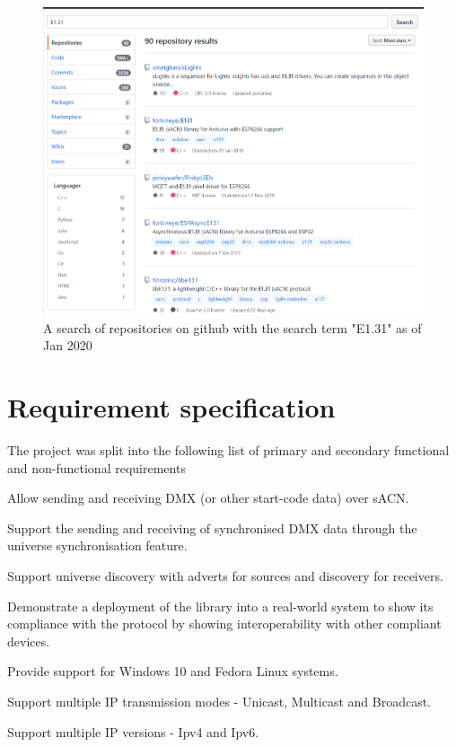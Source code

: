 \documentclass[11pt,a4paper]{article}
\begin{document}
\begin{figure}
	\includegraphics[width=\textwidth]{E131-Repo-Search}
	\caption{A search of repositories on github with the search term "E1.31" as of Jan 2020}
	\label{E131_REPO_SEARCH}
\end{figure}

\section{Requirement specification}
The project was split into the following list of primary and secondary functional and non-functional requirements\\
\begin{list}{}{Primary, Functional Requirements}
	\item Allow sending and receiving DMX (or other start-code data) over sACN.
	\item Support the sending and receiving of synchronised DMX data through the universe synchronisation feature.
	\item Support universe discovery with adverts for sources and discovery for receivers.
\end{list}
\begin{list}{}{Secondary, Non Functional Requirements}
	\item Demonstrate a deployment of the library into a real-world system to show its compliance with the protocol by showing interoperability with other compliant devices.
	\item Provide support for Windows 10 and Fedora Linux systems.
	\item Support multiple IP transmission modes - Unicast, Multicast and Broadcast.
	\item Support multiple IP versions - Ipv4 and Ipv6.
\end{list}
\end{document}
